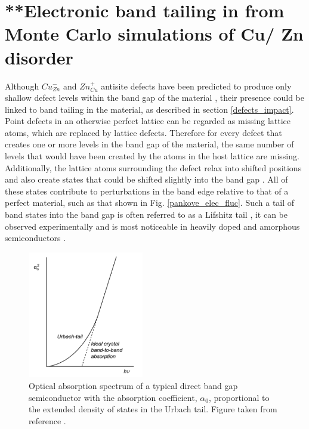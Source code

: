 \documentclass[11pt, twoside]{report}
\begin{document}
\section{**Electronic band tailing in {\CZTS} from Monte Carlo simulations of Cu/ Zn disorder}\label{eris_band_tailing}
Although $Cu_{Zn}^{-}$ and $Zn_{Cu}^{+}$ antisite defects have been predicted to produce only shallow defect levels within the band gap of the material \cite{defects_Chen}, their presence could be linked to band tailing in the material, as described in section \ref{defects_impact}. 
Point defects in an otherwise perfect lattice can be regarded as missing lattice atoms, which are replaced by lattice defects. Therefore for every defect that creates one or more levels in the band gap of the material, the same number of levels that would have been created by the atoms in the host lattice are missing. Additionally, the lattice atoms surrounding the defect relax into shifted positions and also create states that could be shifted slightly into the band gap \cite{thin_film_Boer}. All of these states contribute to perturbations in the band edge relative to that of a perfect material, such as that shown in Fig. \ref{pankove_elec_fluc}. Such a tail of band states into the band gap is often referred to as a Lifshitz tail \cite{Lifshitz1964}, it can be observed experimentally and is most noticeable in heavily doped and amorphous semiconductors \cite{thin_film_Boer}. 
\begin{figure}[h!]
  \centering
    \includegraphics[width=0.45\textwidth]{figures/urbach_fig.png}
    \caption[Optical absorption spectrum of a typical direct band gap semiconductor with the absorption coefficient, $\alpha_{0}$, proportional to the extended density of states in the Urbach tail.]{Optical absorption spectrum of a typical direct band gap semiconductor with the absorption coefficient, $\alpha_{0}$, proportional to the extended density of states in the Urbach tail. Figure taken from reference .}
  \label{urbach_fig}
\end{figure}
\end{document}
